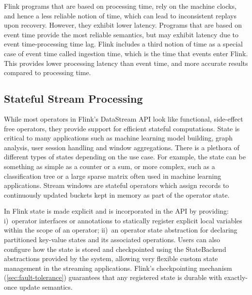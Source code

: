 Flink programs that are based on processing time, rely on the machine clocks, and hence a less reliable notion of time, which can lead to inconsistent replays upon recovery. However, they exhibit lower latency. Programs that are based on event time provide the most reliable semantics, but may exhibit latency due to event time-processing time lag. Flink includes a third notion of time as a special case of event time called ingestion time, which is the time that events enter Flink. This provides  lower processing latency than event time, and more accurate results compared to processing time.


\subsection{Stateful Stream Processing}
While most operators in Flink's DataStream API look like functional, side-effect free operators, they provide support for efficient stateful computations. State is critical to many applications such as machine learning model building, graph analysis, user session handling and window aggregations. There is a plethora of different types of states depending on the use case. For example, the state can be something as simple as a counter or a sum, or more complex, such as a classification tree or a large sparse matrix often used in machine learning applications. Stream windows are  stateful operators which assign records to continuously updated buckets kept in memory as part of the operator state. 

In Flink state is made explicit and is incorporated in the API by providing: i)~operator interfaces or annotations to statically register explicit local variables within the scope of an operator;  ii)~an operator state abstraction for declaring partitioned key-value states and its associated operations. Users can also configure how the state is stored and checkpointed using the StateBackend abstractions provided by the system, allowing very flexible custom state management in the streaming applications. Flink's checkpointing mechanism (\autoref{sec:fault-tolerance}) guarantees that any registered state is durable with exactly-once update semantics. 
\vspace{-8mm}


